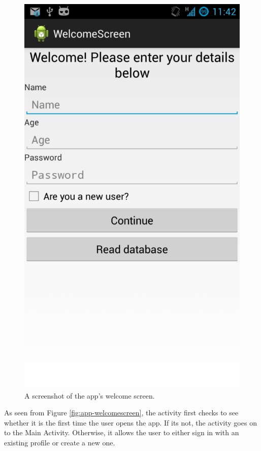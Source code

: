 \begin{figure}[h]
 \centering 
 \includegraphics[clip = true, trim = 0 320 0 60, scale=0.2]{welcome_screen}
 \caption{A screenshot of the app's welcome screen.}
 \label{fig:welcomescreen-screenshot}
\end{figure}

As seen from Figure \ref{fig:app-welcomescreen}, the
activity first checks to see whether it is the first time the user opens the
app. If its not, the activity goes on to the Main Activity. Otherwise, it allows
the user to either sign in with an existing profile or create a new one.

